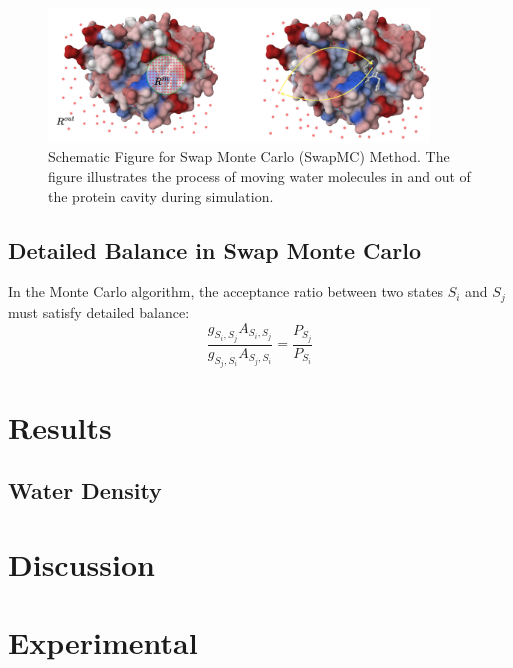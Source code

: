 \documentclass[journal=jacsat,manuscript=article]{achemso}
\begin{document}
\begin{figure}
  \includegraphics[width=0.9\textwidth]{figures/SwapMonteCarlo-scheme.png}
  \caption{Schematic Figure for Swap Monte Carlo (SwapMC) Method.
  The figure illustrates the process of moving water molecules in and out of the protein cavity during simulation.}
  \label{fig:scheme}
\end{figure}

\subsection{Detailed Balance in Swap Monte Carlo}
In the Monte Carlo algorithm, the acceptance ratio between two states $S_i$ and $S_j$ must satisfy detailed balance:
\begin{equation}\label{eq:acceptance_ratio}
\frac{g_{S_i,S_j} A_{S_i,S_j}}{g_{S_j,S_i} A_{S_j,S_i}}=\frac{P_{S_j}}{P_{S_i}}  
\end{equation}


\section{Results}

\subsection{Water Density }


\subsection{}

\section{Discussion}






\section{Experimental}
\end{document}
